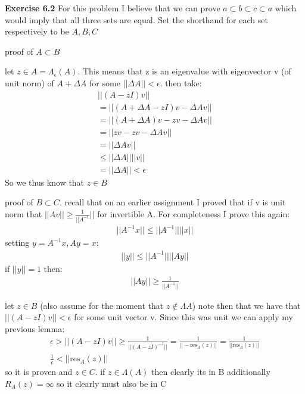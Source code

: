 \documentclass[12pt]{article}
\newenvironment{exercise}[1]{\vspace{.1in}\noindent\textbf{Exercise #1 \hspace{.05em}}}{}
\theoremstyle{definition}
\theoremstyle{remark}
\begin{document}
\begin{exercise}{6.2}
	For this problem I believe that we can prove $a\subset b\subset c\subset a$ which would imply that all three sets are equal. Set the shorthand for each set respectively to be $A,B,C$

	proof of $A\subset B$

	let $z\in A=\Lambda_\epsilon(A)$. This means that z is an eigenvalue with eigenvector v (of unit norm) of $A+\Delta A$ for some $||\Delta A||<\epsilon$. then take:
	\begin{align}
		||(A-zI)v||                     \\
		=||(A+\Delta A-zI)v-\Delta Av|| \\
		=||(A+\Delta A)v-zv-\Delta Av|| \\
		=||zv-zv-\Delta Av||            \\
		=||\Delta Av||                  \\
		\leq ||\Delta A||||v||          \\
		=||\Delta A||<\epsilon
	\end{align}
	So we thus know that $z\in B$

	proof of $B\subset C$. recall that on an earlier assignment I proved that if v is unit norm that $||Av||\geq \frac{1}{||A^{-1}}||$ for invertible A. For completeness I prove this again:
	\begin{align}
		||A^{-1}x||\leq ||A^{-1}||||x||
	\end{align}
	setting $y=A^{-1}x, Ay=x$:
	\begin{align}
		||y||\leq ||A^{-1}||||Ay||
	\end{align}
	if $||y||=1$ then:
	\begin{align}
		||Ay||\geq \frac{1}{||A^{-1}||}
	\end{align}

	let $z\in B$ (also assume for the moment that $z\notin \Lambda A$) note then that we have that $||(A-zI)v||<\epsilon$ for some unit vector v. Since this was unit we can apply my previous lemma:
	\begin{align}
		\epsilon >||(A-zI)v||\geq \frac{1}{||(A-zI)^{-1}||}=\frac{1}{||-\text{res}_A(z)||}=\frac{1}{||\text{res}_A(z)||} \\
		\frac{1}{\epsilon}<||\text{res}_A(z)||
	\end{align}
	so it is proven and $z\in C$. if $z\in \Lambda (A)$ then clearly its in B additionally $R_A(z)=\infty$ so it clearly must also be in C


\end{exercise}
\end{document}

